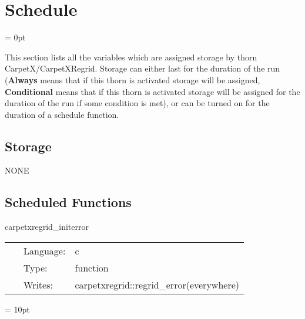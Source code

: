 
\section{Schedule} 


\parskip = 0pt


\noindent This section lists all the variables which are assigned storage by thorn CarpetX/CarpetXRegrid.  Storage can either last for the duration of the run ({\bf Always} means that if this thorn is activated storage will be assigned, {\bf Conditional} means that if this thorn is activated storage will be assigned for the duration of the run if some condition is met), or can be turned on for the duration of a schedule function.


\subsection*{Storage}NONE
\subsection*{Scheduled Functions}
\vspace{5mm}


\hspace{5mm} carpetxregrid\_initerror 

\hspace{5mm}{\it initialize regridding error to zero } 


\hspace{5mm}

 \begin{tabular*}{160mm}{cll} 
~ & Language:  & c \\ 
~ & Type:  & function \\ 
~ & Writes:  & carpetxregrid::regrid\_error(everywhere) \\ 
\end{tabular*} 



\vspace{5mm}\parskip = 10pt 
